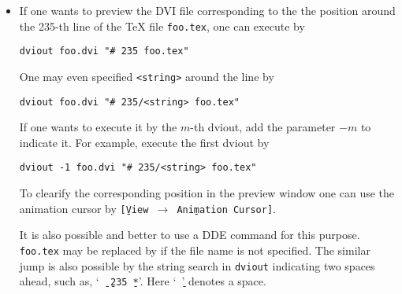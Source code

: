 \documentclass{article}
\begin{document}
\begin{itemize}
\item
If one wants to  preview the DVI file corresponding to the
the position around the 235-th line of the {\TeX} file {\tt foo.tex}, one can
execute by
\begin{verbatim}
dviout foo.dvi "# 235 foo.tex"
\end{verbatim}
One may even specified {\tt <string>} around the line by
\begin{verbatim}
dviout foo.dvi "# 235/<string> foo.tex"
\end{verbatim}
If one wants to execute it by the $m$-th dviout, add the parameter
$-m$ to indicate it.  For example, execute the first dviout by
\begin{verbatim}
dviout -1 foo.dvi "# 235/<string> foo.tex"
\end{verbatim}
To clearify the corresponding position in the preview window
one can use the animation cursor by
{\tt[\b{V}iew $\to$ Ani\b{m}ation Cursor]}.

It is also possible and better to use a DDE command for this purpose.
{\tt foo.tex} may be replaced by {\tt *} if the file name is not specified.
The similar jump is also possible by the string search in {\tt dviout} 
indicating two spaces ahead, such as, `{\tt \b{\ }\b{\ }235\b{\ }*}'.
Here `{\tt\b{\ }}' denotes a space.
\end{itemize}
%
\end{document}
